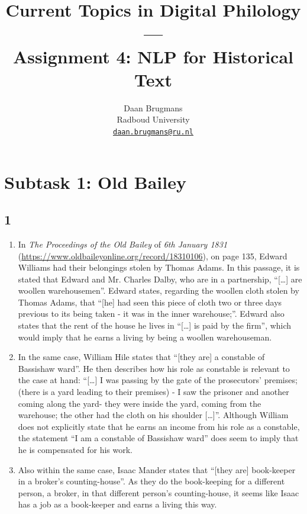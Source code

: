 \documentclass{article}
\title{Current Topics in Digital Philology --- \\Assignment 4: NLP for Historical Text}
\author{%
  Daan Brugmans \\
  Radboud University\\
  \texttt{\url{daan.brugmans@ru.nl}} \\
}
\begin{document}


\maketitle

\section{Subtask 1: Old Bailey}
\subsection{1}
\begin{enumerate}
    \item In \textit{The Proceedings of the Old Bailey} of \textit{6th January 1831} (\url{https://www.oldbaileyonline.org/record/18310106}), on page 135, Edward Williams had their belongings stolen by Thomas Adams. In this passage, it is stated that Edward and Mr. Charles Dalby, who are in a partnership, ``[\dots] are woollen warehousemen''. Edward states, regarding the woollen cloth stolen by Thomas Adams, that ``[he] had seen this piece of cloth two or three days previous to its being taken - it was in the inner warehouse;''. Edward also states that the rent of the house he lives in ``[\dots] is paid by the firm'', which would imply that he earns a living by being a woollen warehouseman.
    \item In the same case, William Hile states that ``[they are] a constable of Bassishaw ward''. He then describes how his role as constable is relevant to the case at hand: ``[\dots] I was passing by the gate of the prosecutors' premises; (there is a yard leading to their premises) - I saw the prisoner and another coming along the yard- they were inside the yard, coming from the warehouse; the other had the cloth on his shoulder [\dots]''. Although William does not explicitly state that he earns an income from his role as a constable, the statement ``I am a constable of Bassishaw ward'' does seem to imply that he is compensated for his work.
    \item Also within the same case, Isaac Mander states that ``[they are] book-keeper in a broker's counting-house''. As they do the book-keeping for a different person, a broker, in that different person's counting-house, it seems like Isaac has a job as a book-keeper and earns a living this way.
\end{enumerate}
\end{document}
